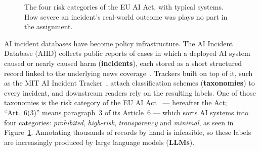 \documentclass[sigconf,natbib=false, language=english]{acmart}
\begin{document}
\begin{figure}[t]
  \centering
  \caption{The four risk categories of the EU AI Act, with typical systems. How severe
  an incident's real-world outcome was plays no part in the assignment.}
  \label{fig:tiers}
\end{figure}

AI incident databases have become policy infrastructure. The AI Incident Database
(AIID) collects public reports of cases in which a deployed AI system caused or nearly
caused harm (\textbf{incidents}), each stored as a short structured record linked to
the underlying news coverage~\cite{mcgregor2021}. Trackers built on top of it, such as
the MIT AI Incident Tracker~\cite{mit_tracker_2026}, attach classification schemes
(\textbf{taxonomies}) to every incident, and downstream readers rely on the resulting
labels. One of those taxonomies is the risk category of the EU AI
Act~\cite{aiact2024} --- hereafter the Act; ``Art.~6(3)'' means paragraph~3 of its
Article~6 --- which sorts AI systems into four categories: \emph{prohibited}, \emph{high-risk}, \emph{transparency} and
\emph{minimal}, as seen in Figure~\ref{fig:tiers}. Annotating thousands of records by
hand is infeasible, so these labels are increasingly produced by large language models
(\textbf{LLMs}).
\end{document}
